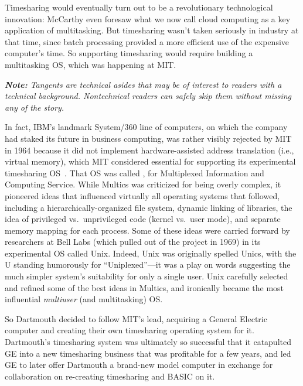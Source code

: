 Timesharing would eventually turn out to be a revolutionary
technological innovation: McCarthy even foresaw what we now call cloud
computing as a key application of multitasking.
But timesharing wasn't taken seriously in industry at that time, since batch
processing provided a more efficient use of the expensive computer's
time.  So supporting
timesharing would require building a multitasking OS, which 
was happening at MIT.


  \begin{tangent}
\emph{\textbf{Note:} Tangents are technical asides that may be of
  interest to readers with a technical background.  Nontechnical
  readers can safely skip them without missing any of the story.}

In fact, IBM's landmark System/360 line of computers, on which the
company had staked its future in business computing, was rather visibly
rejected by MIT in 1964 because it did not implement hardware-assisted 
address translation (i.e., virtual memory), which MIT considered
essential for supporting its experimental timesharing
OS~\cite{ibm360history}.  
That OS was called , for
Multiplexed Information and Computing Service.  While Multics was
criticized for being overly complex, it pioneered ideas that influenced
virtually all operating systems that followed, including a
hierarchically-organized file system, dynamic linking of libraries, the
idea of privileged vs.\ unprivileged code (kernel vs.\ user mode), and
separate memory mapping for each process.
Some of these ideas were carried forward by researchers at Bell Labs
(which pulled out 
of the project in 1969) in its experimental OS called Unix.
Indeed, Unix
was originally spelled Unics, with the U standing humorously for
``Uniplexed''---it was a play on words suggesting the much simpler
system's suitability for only a single user.  Unix carefully selected
and refined some of the best ideas in Multics, and ironically
became the most influential \emph{multiuser} (and multitasking) OS.
  \end{tangent}



So Dartmouth decided to
follow MIT's lead, acquiring a General Electric computer
and creating their own timesharing
operating system for it.
Dartmouth's timesharing system was ultimately so successful that it
catapulted GE into a new timesharing business that was profitable for a
few years, and led GE to later offer Dartmouth a brand-new model
computer in exchange for collaboration on re-creating timesharing and
BASIC on it.



